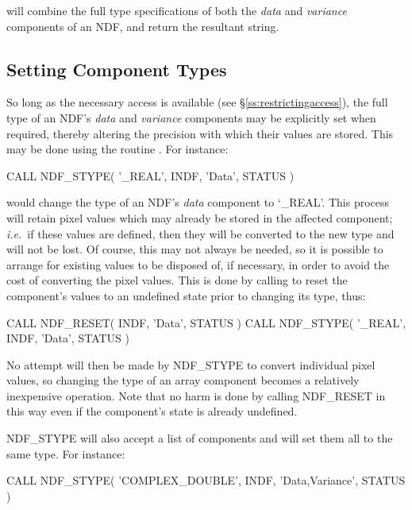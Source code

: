 \documentclass[twoside,11pt,nolof]{starlink}
\providecommand{\st}[1]{{\emph{#1}}}
\begin{document}
will combine the full type specifications of both the \st{data\/} and
\st{variance\/} components of an NDF, and return the resultant string.


\subsection{\label{ss:stype}Setting Component Types}

So long as the necessary access is available (see
\S\ref{ss:restrictingaccess}), the full type of an NDF's \st{data\/}
and \st{variance\/} components may be explicitly set when required,
thereby altering
the precision with which their values are stored.
This may be done using the routine .
For instance:

\small
\begin{terminalv}
      CALL NDF_STYPE( '_REAL', INDF, 'Data', STATUS )
\end{terminalv}
\normalsize

would change the type of an NDF's \st{data\/} component to `\_REAL'.
This process will retain pixel values which may already be stored in the
affected component; \st{i.e.}\ if these values are defined, then they will be
converted to the new type and will not be lost.
Of course, this may not always be needed, so it is possible to arrange for
existing values to be disposed of, if necessary, in order to avoid the cost of
converting the pixel values.
This is done by calling  to reset the component's  values to an
undefined state prior to changing its type, thus:

\small
\begin{terminalv}
      CALL NDF_RESET( INDF, 'Data', STATUS )
      CALL NDF_STYPE( '_REAL', INDF, 'Data', STATUS )
\end{terminalv}
\normalsize

No attempt will then be made by NDF\_STYPE to convert individual pixel values,
so changing the type of an array component becomes a relatively inexpensive
operation.
Note that no harm is done by calling NDF\_RESET in this way even if the
component's state is already undefined.

NDF\_STYPE will also accept a list of components and will set them all to
the same type.
For instance:

\small
\begin{terminalv}
      CALL NDF_STYPE( 'COMPLEX_DOUBLE', INDF, 'Data,Variance', STATUS )
\end{terminalv}
\normalsize
\end{document}
